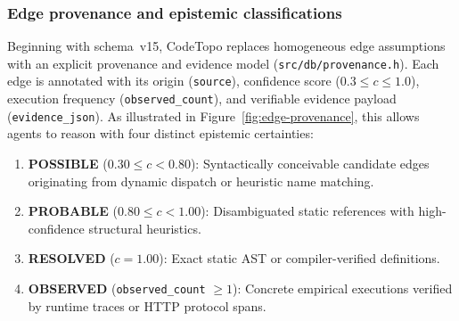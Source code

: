\subsubsection{Edge provenance and epistemic classifications}
\label{sec:edge-provenance}

Beginning with schema~v15, CodeTopo replaces homogeneous edge assumptions with an
explicit provenance and evidence model (\texttt{src/db/provenance.h}). Each edge
is annotated with its origin (\texttt{source}), confidence score ($0.3 \le c \le 1.0$),
execution frequency (\texttt{observed\_count}), and verifiable evidence payload
(\texttt{evidence\_json}). As illustrated in Figure~\ref{fig:edge-provenance}, this allows
agents to reason with four distinct epistemic certainties:
\begin{enumerate}
  \item \textbf{POSSIBLE} ($0.30 \le c < 0.80$): Syntactically conceivable candidate edges
        originating from dynamic dispatch or heuristic name matching.
  \item \textbf{PROBABLE} ($0.80 \le c < 1.00$): Disambiguated static references with high-confidence
        structural heuristics.
  \item \textbf{RESOLVED} ($c = 1.00$): Exact static AST or compiler-verified definitions.
  \item \textbf{OBSERVED} (\texttt{observed\_count} $\ge 1$): Concrete empirical executions verified
        by runtime traces or HTTP protocol spans.
\end{enumerate}

